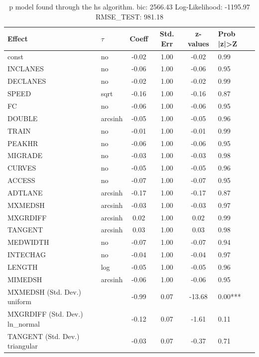 \begin{table}
	\caption{p model found through the hs algorithm. bic: 2566.43 Log-Likelihood: -1195.97 RMSE_TEST: 981.18}
	\begin{center}
		\begin{tabular}{|l|l|c|c|c|l|}
			\hline
			Effect & $\tau$ & Coeff & Std. Err & z-values & Prob |z|>Z \\
			\hline
			const & no & -0.02 & 1.00 & -0.02 & 0.99 \\
			\hline
			INCLANES & no & -0.06 & 1.00 & -0.06 & 0.95 \\
			\hline
			DECLANES & no & -0.02 & 1.00 & -0.02 & 0.99 \\
			\hline
			SPEED & sqrt & -0.16 & 1.00 & -0.16 & 0.87 \\
			\hline
			FC & no & -0.06 & 1.00 & -0.06 & 0.95 \\
			\hline
			DOUBLE & arcsinh & -0.05 & 1.00 & -0.05 & 0.96 \\
			\hline
			TRAIN & no & -0.01 & 1.00 & -0.01 & 0.99 \\
			\hline
			PEAKHR & no & -0.06 & 1.00 & -0.06 & 0.95 \\
			\hline
			MIGRADE & no & -0.03 & 1.00 & -0.03 & 0.98 \\
			\hline
			CURVES & no & -0.05 & 1.00 & -0.05 & 0.96 \\
			\hline
			ACCESS & no & -0.07 & 1.00 & -0.07 & 0.95 \\
			\hline
			ADTLANE & arcsinh & -0.17 & 1.00 & -0.17 & 0.87 \\
			\hline
			MXMEDSH & arcsinh & -0.03 & 1.00 & -0.03 & 0.97 \\
			\hline
			MXGRDIFF & arcsinh & 0.02 & 1.00 & 0.02 & 0.99 \\
			\hline
			TANGENT & arcsinh & 0.03 & 1.00 & 0.03 & 0.98 \\
			\hline
			MEDWIDTH & no & -0.07 & 1.00 & -0.07 & 0.94 \\
			\hline
			INTECHAG & no & -0.04 & 1.00 & -0.04 & 0.97 \\
			\hline
			LENGTH & log & -0.05 & 1.00 & -0.05 & 0.96 \\
			\hline
			MIMEDSH & arcsinh & -0.06 & 1.00 & -0.06 & 0.95 \\
			\hline
			MXMEDSH (Std. Dev.) uniform &  & -0.99 & 0.07 & -13.68 & 0.00*** \\
			\hline
			MXGRDIFF (Std. Dev.) ln_normal &  & -0.12 & 0.07 & -1.61 & 0.11 \\
			\hline
			TANGENT (Std. Dev.) triangular &  & -0.03 & 0.07 & -0.37 & 0.71 \\

\end{tabular}
\end{center}
\end{table}
